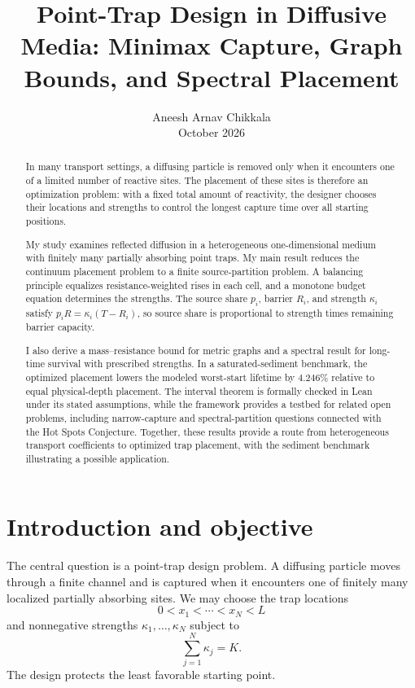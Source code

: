 \documentclass[10pt]{article}
\title{Point-Trap Design in Diffusive Media: Minimax Capture, Graph Bounds, and Spectral Placement}
\author{Aneesh Arnav Chikkala\\\small October 2026}
\date{}
\begin{document}
\maketitle

\begin{abstract}
	In many transport settings, a diffusing particle is removed only when it encounters one of a limited number of reactive sites. The placement of these sites is therefore an optimization problem: with a fixed total amount of reactivity, the designer chooses their locations and strengths to control the longest capture time over all starting positions.
	
My study examines reflected diffusion in a heterogeneous one-dimensional medium with finitely many partially absorbing point traps. My main result reduces the continuum placement problem to a finite source-partition problem. A balancing principle equalizes resistance-weighted rises in each cell, and a monotone budget equation determines the strengths. The source share $p_i$, barrier $R_i$, and strength $\kappa_i$ satisfy $p_iR=\kappa_i(T-R_i)$, so source share is proportional to strength times remaining barrier capacity.
	
	I also derive a mass--resistance bound for metric graphs and a spectral result for long-time survival with prescribed strengths. In a saturated-sediment benchmark, the optimized placement lowers the modeled worst-start lifetime by $4.246\%$ relative to equal physical-depth placement. The interval theorem is formally checked in Lean under its stated assumptions, while the framework provides a testbed for related open problems, including narrow-capture and spectral-partition questions connected with the Hot Spots Conjecture. Together, these results provide a route from heterogeneous transport coefficients to optimized trap placement, with the sediment benchmark illustrating a possible application.
\end{abstract}

\section{Introduction and objective}

The central question is a point-trap design problem. A diffusing particle moves through a finite channel and is captured when it encounters one of finitely many localized partially absorbing sites. We may choose the trap locations
\[
0<x_1<\cdots <x_N<L
\]
and nonnegative strengths $\kappa_1,\ldots,\kappa_N$ subject to
\[
\sum_{j=1}^{N}\kappa_j=K.
\]
The design protects the least favorable starting point.
\end{document}
